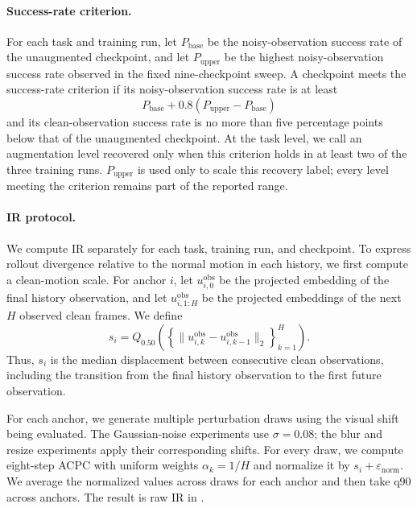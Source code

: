 \documentclass{article}
\begin{document}
\paragraph{Success-rate criterion.}
For each task and training run, let $P_{\mathrm{base}}$ be the
noisy-observation success rate of the unaugmented checkpoint, and let
$P_{\mathrm{upper}}$ be the highest noisy-observation success rate observed in
the fixed nine-checkpoint sweep. A checkpoint meets the success-rate criterion if its
noisy-observation success rate is at least
\[
P_{\mathrm{base}}+0.8(P_{\mathrm{upper}}-P_{\mathrm{base}})
\]
and its clean-observation success rate is no more than five percentage points
below that of the unaugmented checkpoint. At the task level, we call an
augmentation level recovered only when this criterion holds in at least two
of the three training runs. $P_{\mathrm{upper}}$ is used only to scale this
recovery label; every level meeting the criterion remains part of the reported
range.

\paragraph{IR protocol.}
We compute IR separately for each task, training run, and checkpoint. To
express rollout divergence relative to the normal motion in each history, we
first compute a clean-motion scale. For anchor $i$, let
$u^{\mathrm{obs}}_{i,0}$ be the projected embedding of the final history
observation, and let $u^{\mathrm{obs}}_{i,1:H}$ be the projected embeddings of
the next $H$ observed clean frames. We define
\begin{equation}
s_i
=Q_{0.50}\!\left(
\left\{\|u^{\mathrm{obs}}_{i,k}-u^{\mathrm{obs}}_{i,k-1}\|_2
\right\}_{k=1}^{H}
\right).
\label{eq:clean-transition-scale}
\end{equation}
Thus, $s_i$ is the median displacement between consecutive clean observations,
including the transition from the final history observation to the first
future observation.

For each anchor, we generate multiple perturbation draws using the visual
shift being evaluated. The Gaussian-noise experiments use $\sigma=0.08$; the
blur and resize experiments apply their corresponding shifts. For every draw,
we compute eight-step ACPC with uniform weights $\alpha_k=1/H$ and normalize it
by $s_i+\varepsilon_{\mathrm{norm}}$. We average the normalized values across
draws for each anchor and then take q90 across anchors. The result is raw IR in
.
\end{document}

